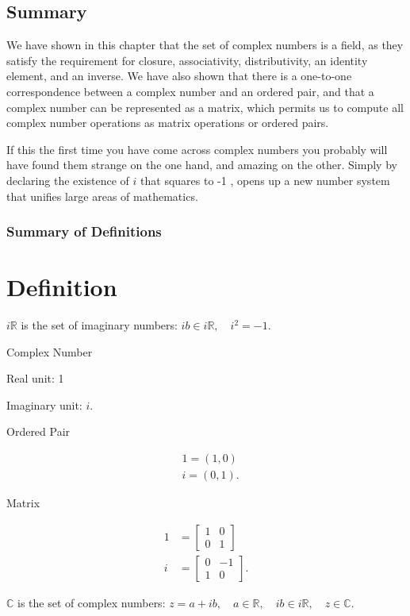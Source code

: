 \documentclass[10pt]{article}
\begin{document}
\subsection{Summary}
We have shown in this chapter that the set of complex numbers is a field, as they satisfy the requirement for closure, associativity, distributivity, an identity element, and an inverse. We have also shown that there is a one-to-one correspondence between a complex number and an ordered pair, and that a complex number can be represented as a matrix, which permits us to compute all complex number operations as matrix operations or ordered pairs.

If this the first time you have come across complex numbers you probably will have found them strange on the one hand, and amazing on the other. Simply by declaring the existence of $i$ that squares to -1 , opens up a new number system that unifies large areas of mathematics.

\subsubsection{Summary of Definitions}
\section{Definition}
$i \mathbb{R}$ is the set of imaginary numbers: $i b \in i \mathbb{R}, \quad i^{2}=-1$.

Complex Number

Real unit: 1

Imaginary unit: $i$.

Ordered Pair

$$
\begin{aligned}
& 1=(1,0) \\
& i=(0,1) .
\end{aligned}
$$

Matrix

$$
\begin{aligned}
1 & =\left[\begin{array}{ll}
1 & 0 \\
0 & 1
\end{array}\right] \\
i & =\left[\begin{array}{cc}
0 & -1 \\
1 & 0
\end{array}\right] .
\end{aligned}
$$

$\mathbb{C}$ is the set of complex numbers: $z=a+i b, \quad a \in \mathbb{R}, \quad i b \in i \mathbb{R}, \quad z \in \mathbb{C}$.
\end{document}
